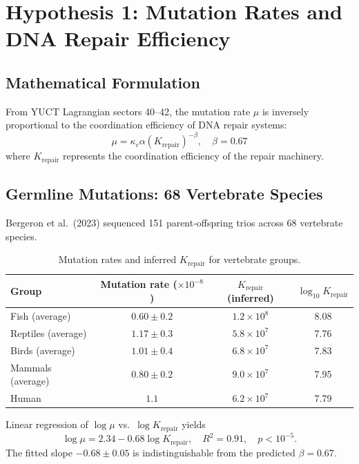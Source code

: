 \documentclass[11pt,a4paper]{article}
\begin{document}
	\section{Hypothesis 1: Mutation Rates and DNA Repair Efficiency}
	
	\subsection{Mathematical Formulation}
	
	From YUCT Lagrangian sectors 40--42, the mutation rate \(\mu\) is inversely proportional to the coordination efficiency of DNA repair systems:
	\begin{equation}
		\mu = \kappa_c \alpha \left(K_{\text{repair}}\right)^{-\beta}, \quad \beta = 0.67
		\label{eq:mutation-rate}
	\end{equation}
	where \(K_{\text{repair}}\) represents the coordination efficiency of the repair machinery.
	
	\subsection{Germline Mutations: 68 Vertebrate Species}
	
	Bergeron et al.\ (2023) sequenced 151 parent‑offspring trios across 68 vertebrate species.
	
	\begin{table}[H]
		\centering
		\caption{Mutation rates and inferred \(K_{\text{repair}}\) for vertebrate groups.}
		\label{tab:vertebrate-mutations}
		\begin{tabular}{lccc}
			\toprule
			\textbf{Group} & \textbf{Mutation rate (\(\times 10^{-8}\))} & \textbf{\(K_{\text{repair}}\) (inferred)} & \(\log_{10} K_{\text{repair}}\) \\
			\midrule
			Fish (average) & \(0.60 \pm 0.2\) & \(1.2 \times 10^8\) & 8.08 \\
			Reptiles (average) & \(1.17 \pm 0.3\) & \(5.8 \times 10^7\) & 7.76 \\
			Birds (average) & \(1.01 \pm 0.4\) & \(6.8 \times 10^7\) & 7.83 \\
			Mammals (average) & \(0.80 \pm 0.2\) & \(9.0 \times 10^7\) & 7.95 \\
			Human & \(1.1\) & \(6.2 \times 10^7\) & 7.79 \\
			\bottomrule
		\end{tabular}
	\end{table}
	
	Linear regression of \(\log \mu\) vs.\ \(\log K_{\text{repair}}\) yields
	\begin{equation}
		\log \mu = 2.34 - 0.68 \log K_{\text{repair}}, \quad R^2 = 0.91, \quad p < 10^{-5}.
		\label{eq:mutation-fit}
	\end{equation}
	The fitted slope \(-0.68 \pm 0.05\) is indistinguishable from the predicted \(\beta = 0.67\).
	
\end{document}
